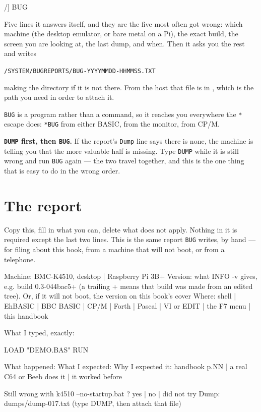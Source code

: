 \begin{type}
/] BUG
\end{type}

\noindent Five lines it answers itself, and they are the five most often
got wrong: which machine (the desktop emulator, or bare metal on a Pi),
the exact build, the screen you are looking at, the last dump, and when.
Then it asks you the rest and writes

\begin{center}
\texttt{/SYSTEM/BUGREPORTS/BUG-YYYYMMDD-HHMMSS.TXT}
\end{center}

\noindent making the directory if it is not there. From the host that
file is in , which is the path you need in
order to attach it.

\verb|BUG| is a program rather than a command, so it reaches you
everywhere the \texttt{*} escape does: \verb|*BUG| from either BASIC,
from the monitor, from CP/M.

\begin{aside}
\textbf{\texttt{DUMP} first, then \texttt{BUG}.} If the report's
\texttt{Dump} line says there is none, the machine is telling you that
the more valuable half is missing. Type \verb|DUMP| while it is still
wrong and run \verb|BUG| again --- the two travel together, and this is
the one thing that is easy to do in the wrong order.
\end{aside}

\section{The report}
Copy this, fill in what you can, delete what does not apply. Nothing in
it is required except the last two lines. This is the same report
\verb|BUG| writes, by hand --- for filing about this book, from a
machine that will not boot, or from a telephone.

\begin{form}
Machine:  BMC-K4510, desktop  |  Raspberry Pi 3B+
Version:  what INFO -v gives, e.g. build 0.3-044bac5+  (a trailing
          + means that build was made from an edited tree).  Or,
          if it will not boot, the version on this book's cover
Where:    shell | EhBASIC | BBC BASIC | CP/M | Forth | Pascal |
          VI or EDIT | the F7 menu | this handbook

What I typed, exactly:

    LOAD "DEMO.BAS"
    RUN

What happened:
What I expected:
Why I expected it:  handbook p.NN | a real C64 or Beeb does it |
                    it worked before

Still wrong with  k4510 --no-startup.bat ?   yes | no | did not try
Dump:  dumps/dump-017.txt   (type DUMP, then attach that file)
\end{form}

